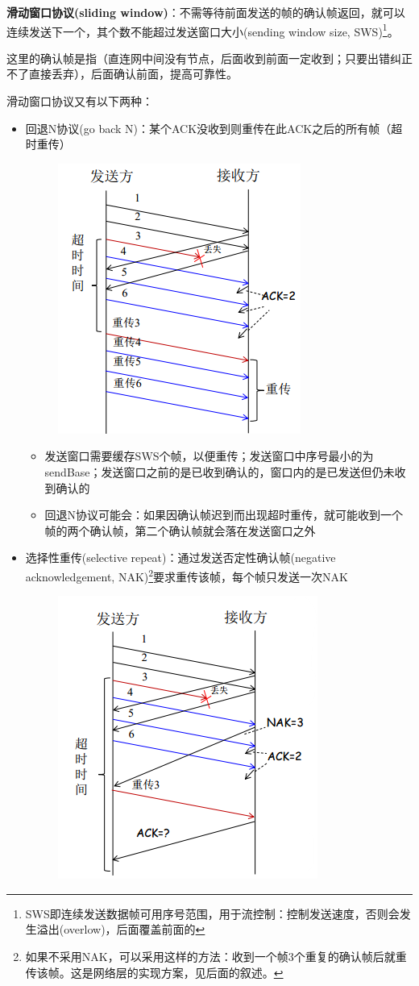 \myhline
\textbf{滑动窗口协议(sliding window)}：不需等待前面发送的帧的确认帧返回，就可以连续发送下一个，其个数不能超过发送窗口大小(sending window size, SWS)\footnote{SWS即连续发送数据帧可用序号范围，用于流控制：控制发送速度，否则会发生溢出(overlow)，后面覆盖前面的}。

这里的确认帧是指（直连网中间没有节点，后面收到前面一定收到；只要出错纠正不了直接丢弃），后面确认前面，提高可靠性。

滑动窗口协议又有以下两种：
\begin{itemize}
\item 回退N协议(go back N)：某个ACK没收到则重传在此ACK之后的所有帧（超时重传）
\begin{figure}[H]
	\centering
	\includegraphics[width=0.3\linewidth]{fig/go-back-n.png}
\end{figure}
\begin{itemize}
	\item 发送窗口需要缓存SWS个帧，以便重传；发送窗口中序号最小的为sendBase；发送窗口之前的是已收到确认的，窗口内的是已发送但仍未收到确认的
	\item 回退N协议可能会：如果因确认帧迟到而出现超时重传，就可能收到一个帧的两个确认帧，第二个确认帧就会落在发送窗口之外
\end{itemize}
\item 选择性重传(selective repeat)：通过发送否定性确认帧(negative acknowledgement, NAK)\footnote{如果不采用NAK，可以采用这样的方法：收到一个帧3个重复的确认帧后就重传该帧。这是网络层的实现方案，见后面的叙述。}要求重传该帧，每个帧只发送一次NAK
\begin{figure}[H]
	\centering
	\includegraphics[width=0.3\linewidth]{fig/selective-repeat.png}

\end{figure}
\end{itemize}
